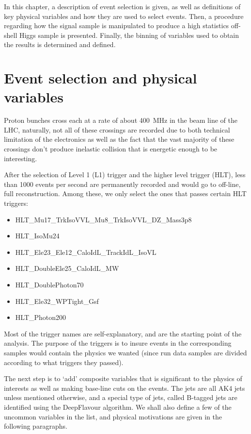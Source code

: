 In this chapter, a description of event selection is given, as well as definitions of
key physical variables and how they are used to select events. Then, a procedure regarding
how the signal sample is manipulated to produce a high statistics off-shell Higgs sample is presented.
Finally, the binning of variables used to obtain the results is determined and defined.

\section{Event selection and physical variables}
Proton bunches cross each at a rate of about \SI{400}{\mega\hertz} in the beam line of
the LHC, naturally, not all of these crossings are recorded due to both technical
limitation of the electronics as well as the fact that the vast majority of these
crossings don't produce inelastic collision that is energetic enough to be interesting.

After the selection of Level 1 (L1) trigger and the higher level trigger (HLT), less than 1000
events per second are permanently recorded and would go to off-line, full reconstruction. Among these,
we only select the ones that passes certain HLT triggers:
\begin{itemize}
    \item HLT\_Mu17\_TrkIsoVVL\_Mu8\_TrkIsoVVL\_DZ\_Mass3p8
    \item HLT\_IsoMu24
    \item HLT\_Ele23\_Ele12\_CaloIdL\_TrackIdL\_IsoVL
    \item HLT\_DoubleEle25\_CaloIdL\_MW
    \item HLT\_DoublePhoton70
    \item HLT\_Ele32\_WPTight\_Gsf
    \item HLT\_Photon200
\end{itemize}
Most of the trigger names are self-explanatory, and are the starting point of the analysis. The
purpose of the triggers is to insure events in the corresponding samples would contain the physics
we wanted (since run data samples are divided according to what triggers they passed).

The next step is to `add' composite variables that is significant to the physics of interests as
well as making base-line cuts on the events.
The jets are all AK4 jets unless mentioned otherwise, and a special type of jets, called B-tagged
jets are  identified using the DeepFlavour algorithm.\cite{deepflavour}  
We shall also define a few of the
uncommon variables in the list, and physical motivations are given in the following
paragraphs.

